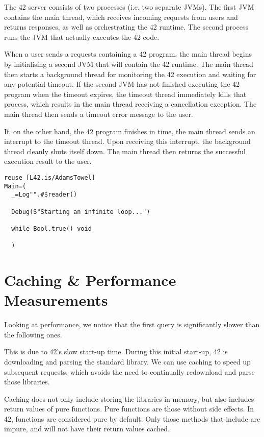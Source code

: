 
The 42 server consists of two processes (i.e. two separate JVMs). The first JVM contains the main thread, which receives incoming requests from users and returns responses, as well as orchestrating the 42 runtime. The second process runs the JVM that actually executes the 42 code.

When a user sends a requests containing a 42 program, the main thread begins by initialising a second JVM that will contain the 42 runtime. The main thread then starts a background thread for monitoring the 42 execution and waiting for any potential timeout. If the second JVM has not finished executing the 42 program when the timeout expires, the timeout thread immediately kills that process, which results in the main thread receiving a cancellation exception. The main thread then sends a timeout error message to the user.

If, on the other hand, the 42 program finishes in time, the main thread sends an interrupt to the timeout thread. Upon receiving this interrupt, the background thread cleanly shuts itself down. The main thread then returns the successful execution result to the user.

\begin{lstlisting}[caption=Infinite Loop in 42]
reuse [L42.is/AdamsTowel]
Main=(
  _=Log"".#$reader()

  Debug(S"Starting an infinite loop...")
  
  while Bool.true() void
  
  )
\end{lstlisting}

\section{Caching \& Performance Measurements}

Looking at performance, we notice that the first query is significantly slower than the following ones.

This is due to 42's slow start-up time. During this initial start-up, 42 is downloading and parsing the standard library. We can use caching to speed up subsequent requests, which avoids the need to continually redownload and parse those libraries.

Caching does not only include storing the libraries in memory, but also includes return values of pure functions. Pure functions are those without side effects. In 42, functions are considered pure by default. Only those methods that include \code{\#\$} are impure, and will not have their return values cached.

